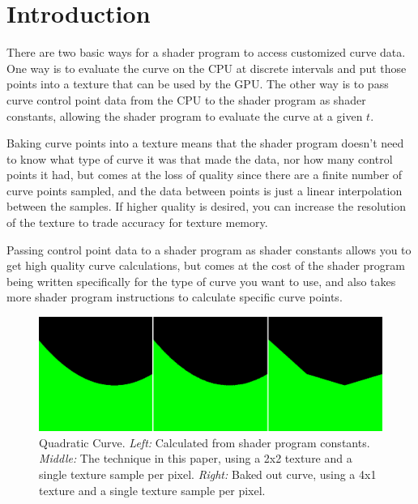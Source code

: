 \documentclass{jcgt}
\begin{document}
\section{Introduction}
\label{sec:introduction}
There are two basic ways for a shader program to access customized curve data.  One way is to evaluate the curve on the CPU at discrete intervals and put those points into a texture that can be used by the GPU.  The other way is to pass curve control point data from the CPU to the shader program as shader constants, allowing the shader program to evaluate the curve at a given $t$.

Baking curve points into a texture means that the shader program doesn't need to know what type of curve it was that made the data, nor how many control points it had, but comes at the loss of quality since there are a finite number of curve points sampled, and the data between points is just a linear interpolation between the samples.  If higher quality is desired, you can increase the resolution of the texture to trade accuracy for texture memory.

Passing control point data to a shader program as shader constants allows you to get high quality curve calculations, but comes at the cost of the shader program being written specifically for the type of curve you want to use, and also takes more shader program instructions to calculate specific curve points.

\begin{figure}
  \includegraphics[width=5in]{Figure2.png}
  \caption{Quadratic Curve.  \textit{Left:} Calculated from shader program constants.  \textit{Middle:} The technique in this paper, using a 2x2 texture and a single texture sample per pixel.  \textit{Right:} Baked out curve, using a 4x1 texture and a single texture sample per pixel.}
  \label{fig:quickcomparison}
\end{figure}
\end{document}

